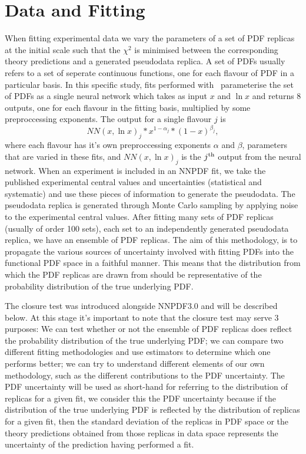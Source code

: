 \section{Data and Fitting}
When fitting experimental data we vary the parameters of a set of PDF replicas
at the initial scale such that the $\chi^2$ is minimised between the
corresponding theory predictions and a generated pseudodata replica. A set of
PDFs usually refers to a set of seperate continuous functions, one for each
flavour of PDF in a particular basis. In this specific study, fits performed
with \nfit\ parameterise the set of PDFs as a single neural network which takes
as input $x$ and $\ln x$ and returns 8 outputs, one for each flavour in the
fitting basis, multiplied by some preproccessing exponents. The output for a
single flavour $j$ is
\begin{equation}
    NN(x, \ln x)_j * x^{1-\alpha_j} * (1-x)^{\beta_j},
\end{equation}
where each flavour has it's own preproccessing exponents $\alpha$ and $\beta$,
parameters that are varied in these fits, and $NN(x, \ln x)_j$ is the
$j^{\rm th}$ output from the neural network.
When an experiment is included in an NNPDF fit, we take the published
experimental central values and uncertainties (statistical and systematic)
and use these pieces of information to generate the pseudodata.
The pseudodata replica is generated
through Monte Carlo sampling by applying noise to the experimental
central values.
After fitting many sets of PDF replicas (usually of order 100 sets),
each set to an independently generated pseudodata replica, we have an ensemble of
PDF replicas.
The aim of this methodology, is to propagate the various sources of
uncertainty involved with fitting PDFs into the functional PDF space in a faithful
manner. This means that the distribution from which the PDF replicas are drawn
from should be representative of the probability distribution of the true
underlying PDF.

The closure test was introduced alongside NNPDF3.0 and will be described below.
At this stage it's important to note that the closure test may serve 3 purposes:
We can test whether or not the ensemble of PDF replicas does reflect the
probability distribution of the true underlying PDF; we can compare two different
fitting methodologies and use estimators to determine which one performs better;
we can try to understand different elements of our own methodology, such as
the different contributions to the PDF uncertainty. The PDF uncertainty will
be used as short-hand for referring to the distribution of replicas for a given
fit, we consider this the PDF uncertainty because if the distribution
of the true underlying PDF is reflected by the distribution of replicas for
a given fit, then the standard deviation of the replicas in PDF space or the
theory predictions obtained from those replicas in data space represents
the uncertainty of the prediction having performed a fit.

